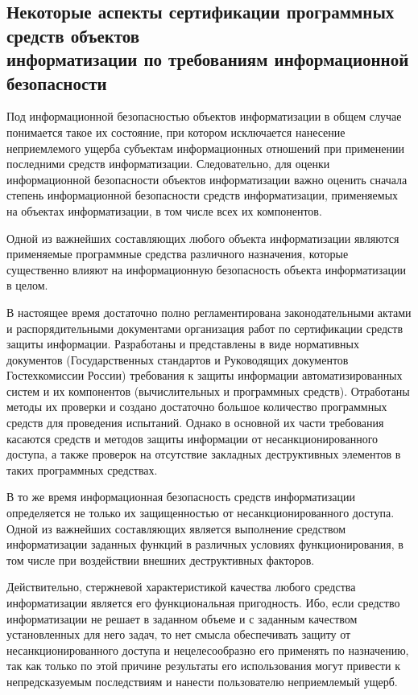\subsection{Некоторые аспекты сертификации программных средств объектов\\ информатизации по требованиям информационной безопасности}

Под информационной безопасностью объектов информатизации в общем случае понимается такое их состояние, при котором исключается нанесение неприемлемого ущерба субъектам информационных отношений при применении последними средств информатизации. Следовательно, для оценки информационной безопасности объектов информатизации важно оценить сначала степень информационной безопасности средств информатизации, применяемых на объектах информатизации, в том числе всех их компонентов.

Одной из важнейших составляющих любого объекта информатизации являются применяемые программные средства различного назначения, которые существенно влияют на информационную безопасность объекта информатизации в целом.

В настоящее время достаточно полно регламентирована законодательными актами и распорядительными документами организация работ по сертификации средств защиты информации. Разработаны и представлены в виде нормативных документов (Государственных стандартов и Руководящих документов Гостехкомиссии России) требования к защиты информации автоматизированных систем и их компонентов (вычислительных и программных средств). Отработаны методы их проверки и создано достаточно большое количество программных средств для проведения испытаний. Однако в основной их части требования касаются средств и методов защиты информации от несанкционированного доступа, а также проверок на отсутствие закладных деструктивных элементов в таких программных средствах.

В то же время информационная безопасность средств информатизации определяется не только их защищенностью от несанкционированного доступа. Одной из важнейших составляющих является выполнение средством информатизации заданных функций в различных условиях функционирования, в том числе при воздействии внешних деструктивных факторов.

Действительно, стержневой характеристикой качества любого средства информатизации является его функциональная пригодность. Ибо, если средство информатизации не решает в заданном объеме и с заданным качеством установленных для него задач, то нет смысла обеспечивать защиту от несанкционированного доступа и нецелесообразно его применять по назначению, так как только по этой причине результаты его использования могут привести к непредсказуемым последствиям и нанести пользователю неприемлемый ущерб.

